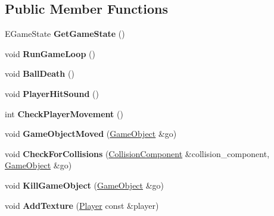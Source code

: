 \subsection*{Public Member Functions}
\begin{DoxyCompactItemize}
\item 
\hypertarget{class_game_manager_a36b467dc701d22dd02d72a4dd0e0bdc2}{}E\+Game\+State {\bfseries Get\+Game\+State} ()\label{class_game_manager_a36b467dc701d22dd02d72a4dd0e0bdc2}

\item 
\hypertarget{class_game_manager_ae7f224b3696274ab4b355e5af63edf29}{}void {\bfseries Run\+Game\+Loop} ()\label{class_game_manager_ae7f224b3696274ab4b355e5af63edf29}

\item 
\hypertarget{class_game_manager_abda2e6be34b2c3d7607c27987d1b4551}{}void {\bfseries Ball\+Death} ()\label{class_game_manager_abda2e6be34b2c3d7607c27987d1b4551}

\item 
\hypertarget{class_game_manager_a43b63727943148e67a1c963dac36a26f}{}void {\bfseries Player\+Hit\+Sound} ()\label{class_game_manager_a43b63727943148e67a1c963dac36a26f}

\item 
\hypertarget{class_game_manager_a016dea3f03905d58e8b4a59e52f58a0d}{}int {\bfseries Check\+Player\+Movement} ()\label{class_game_manager_a016dea3f03905d58e8b4a59e52f58a0d}

\item 
\hypertarget{class_game_manager_a36184a4bd75970a27de0d4609a79dcc0}{}void {\bfseries Game\+Object\+Moved} (\hyperlink{class_game_object}{Game\+Object} \&go)\label{class_game_manager_a36184a4bd75970a27de0d4609a79dcc0}

\item 
\hypertarget{class_game_manager_a188b4daa16f007a21c9ca58d9af41042}{}void {\bfseries Check\+For\+Collisions} (\hyperlink{class_collision_component}{Collision\+Component} \&collision\+\_\+component, \hyperlink{class_game_object}{Game\+Object} \&go)\label{class_game_manager_a188b4daa16f007a21c9ca58d9af41042}

\item 
\hypertarget{class_game_manager_ac0998737c239c1cb4f2d631ffdcff429}{}void {\bfseries Kill\+Game\+Object} (\hyperlink{class_game_object}{Game\+Object} \&go)\label{class_game_manager_ac0998737c239c1cb4f2d631ffdcff429}

\item 
\hypertarget{class_game_manager_a2f3cd3ea5d0fbf5cfb7025c4f093dde6}{}void {\bfseries Add\+Texture} (\hyperlink{class_player}{Player} const \&player)\label{class_game_manager_a2f3cd3ea5d0fbf5cfb7025c4f093dde6}


\end{DoxyCompactItemize}
